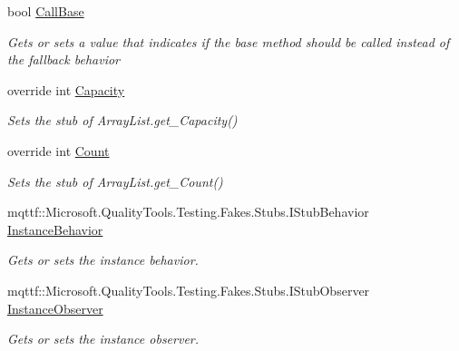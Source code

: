 \begin{DoxyCompactItemize}
\item 
bool \hyperlink{class_system_1_1_collections_1_1_fakes_1_1_stub_array_list_af47214b1d6c11c38c01cbb4946e685b1}{Call\-Base}
\begin{DoxyCompactList}\small\item\em Gets or sets a value that indicates if the base method should be called instead of the fallback behavior\end{DoxyCompactList}\item 
override int \hyperlink{class_system_1_1_collections_1_1_fakes_1_1_stub_array_list_a7c50402e6dd03b1627e1b56a29aa2ed0}{Capacity}
\begin{DoxyCompactList}\small\item\em Sets the stub of Array\-List.\-get\-\_\-\-Capacity()\end{DoxyCompactList}\item 
override int \hyperlink{class_system_1_1_collections_1_1_fakes_1_1_stub_array_list_ae40e82e4759e44047bbad97fb5b0670d}{Count}
\begin{DoxyCompactList}\small\item\em Sets the stub of Array\-List.\-get\-\_\-\-Count()\end{DoxyCompactList}\item 
mqttf\-::\-Microsoft.\-Quality\-Tools.\-Testing.\-Fakes.\-Stubs.\-I\-Stub\-Behavior \hyperlink{class_system_1_1_collections_1_1_fakes_1_1_stub_array_list_a301ae3cf0a0f29a6445d04ba85b3a143}{Instance\-Behavior}
\begin{DoxyCompactList}\small\item\em Gets or sets the instance behavior.\end{DoxyCompactList}\item 
mqttf\-::\-Microsoft.\-Quality\-Tools.\-Testing.\-Fakes.\-Stubs.\-I\-Stub\-Observer \hyperlink{class_system_1_1_collections_1_1_fakes_1_1_stub_array_list_a3617b69753b39b4d6cd78346ca59e6c8}{Instance\-Observer}
\begin{DoxyCompactList}\small\item\em Gets or sets the instance observer.\end{DoxyCompactList}\item 

\end{DoxyCompactItemize}
